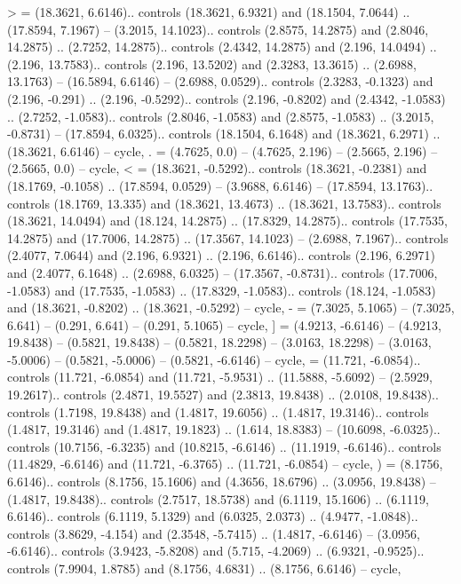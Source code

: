 {>} = {(18.3621, 6.6146).. controls (18.3621, 6.9321) and (18.1504, 7.0644) .. (17.8594, 7.1967) -- (3.2015, 14.1023).. controls (2.8575, 14.2875) and (2.8046, 14.2875) .. (2.7252, 14.2875).. controls (2.4342, 14.2875) and (2.196, 14.0494) .. (2.196, 13.7583).. controls (2.196, 13.5202) and (2.3283, 13.3615) .. (2.6988, 13.1763) -- (16.5894, 6.6146) -- (2.6988, 0.0529).. controls (2.3283, -0.1323) and (2.196, -0.291) .. (2.196, -0.5292).. controls (2.196, -0.8202) and (2.4342, -1.0583) .. (2.7252, -1.0583).. controls (2.8046, -1.0583) and (2.8575, -1.0583) .. (3.2015, -0.8731) -- (17.8594, 6.0325).. controls (18.1504, 6.1648) and (18.3621, 6.2971) .. (18.3621, 6.6146) -- cycle},
{.} = {(4.7625, 0.0) -- (4.7625, 2.196) -- (2.5665, 2.196) -- (2.5665, 0.0) -- cycle},
{<} = {(18.3621, -0.5292).. controls (18.3621, -0.2381) and (18.1769, -0.1058) .. (17.8594, 0.0529) -- (3.9688, 6.6146) -- (17.8594, 13.1763).. controls (18.1769, 13.335) and (18.3621, 13.4673) .. (18.3621, 13.7583).. controls (18.3621, 14.0494) and (18.124, 14.2875) .. (17.8329, 14.2875).. controls (17.7535, 14.2875) and (17.7006, 14.2875) .. (17.3567, 14.1023) -- (2.6988, 7.1967).. controls (2.4077, 7.0644) and (2.196, 6.9321) .. (2.196, 6.6146).. controls (2.196, 6.2971) and (2.4077, 6.1648) .. (2.6988, 6.0325) -- (17.3567, -0.8731).. controls (17.7006, -1.0583) and (17.7535, -1.0583) .. (17.8329, -1.0583).. controls (18.124, -1.0583) and (18.3621, -0.8202) .. (18.3621, -0.5292) -- cycle},
{-} = {(7.3025, 5.1065) -- (7.3025, 6.641) -- (0.291, 6.641) -- (0.291, 5.1065) -- cycle},
{]} = {(4.9213, -6.6146) -- (4.9213, 19.8438) -- (0.5821, 19.8438) -- (0.5821, 18.2298) -- (3.0163, 18.2298) -- (3.0163, -5.0006) -- (0.5821, -5.0006) -- (0.5821, -6.6146) -- cycle},
{\ctpbackslash} = {(11.721, -6.0854).. controls (11.721, -6.0854) and (11.721, -5.9531) .. (11.5888, -5.6092) -- (2.5929, 19.2617).. controls (2.4871, 19.5527) and (2.3813, 19.8438) .. (2.0108, 19.8438).. controls (1.7198, 19.8438) and (1.4817, 19.6056) .. (1.4817, 19.3146).. controls (1.4817, 19.3146) and (1.4817, 19.1823) .. (1.614, 18.8383) -- (10.6098, -6.0325).. controls (10.7156, -6.3235) and (10.8215, -6.6146) .. (11.1919, -6.6146).. controls (11.4829, -6.6146) and (11.721, -6.3765) .. (11.721, -6.0854) -- cycle},
{)} = {(8.1756, 6.6146).. controls (8.1756, 15.1606) and (4.3656, 18.6796) .. (3.0956, 19.8438) -- (1.4817, 19.8438).. controls (2.7517, 18.5738) and (6.1119, 15.1606) .. (6.1119, 6.6146).. controls (6.1119, 5.1329) and (6.0325, 2.0373) .. (4.9477, -1.0848).. controls (3.8629, -4.154) and (2.3548, -5.7415) .. (1.4817, -6.6146) -- (3.0956, -6.6146).. controls (3.9423, -5.8208) and (5.715, -4.2069) .. (6.9321, -0.9525).. controls (7.9904, 1.8785) and (8.1756, 4.6831) .. (8.1756, 6.6146) -- cycle},
